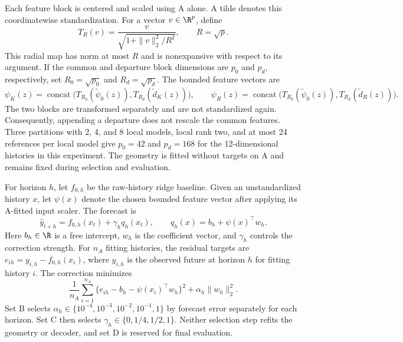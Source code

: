 Each feature block is centered and scaled using A alone. A tilde denotes
this coordinatewise standardization. For a vector $v\in\R^p$, define
\begin{equation}
 T_R(v)=\frac{v}{\sqrt{1+\|v\|_2^2/R^2}},\qquad R=\sqrt p.
 \label{eq:mechanism-main-radial}
\end{equation}
This radial map has norm at most $R$ and is nonexpansive with respect to
its argument. If the common and departure block dimensions are $p_0$
and $p_d$, respectively, set $R_0=\sqrt{p_0}$ and $R_d=\sqrt{p_d}$.
The bounded feature vectors are
\[
 \psi_K(z)=\operatorname{concat}\bigl(
       T_{R_0}(\widetilde\psi_0(z)),T_{R_d}(\widetilde d_K(z))\bigr),
 \qquad
 \psi_R(z)=\operatorname{concat}\bigl(
       T_{R_0}(\widetilde\psi_0(z)),T_{R_d}(\widetilde d_R(z))\bigr).
\]
The two blocks are transformed separately and are not standardized again.
Consequently, appending a departure does not rescale the common features.
Three partitions with 2, 4, and 8 local models, local rank two, and at
most 24 references per local model give $p_0=42$ and $p_d=168$ for the
12-dimensional histories in this experiment. The geometry is fitted
without targets on A and remains fixed during selection and evaluation.

For horizon $h$, let $f_{0,h}$ be the raw-history ridge baseline. Given
an unstandardized history $x$, let $\psi(x)$ denote the chosen bounded
feature vector after applying its A-fitted input scaler. The forecast is
\begin{equation}
 \widehat y_{t+h}=f_{0,h}(x_t)+\gamma_h q_h(x_t),\qquad
 q_h(x)=b_h+\psi(x)^\top w_h.
 \label{eq:mechanism-main-forecast}
\end{equation}
Here $b_h\in\R$ is a free intercept, $w_h$ is the coefficient vector,
and $\gamma_h$ controls the correction strength. For $n_A$ fitting
histories, the residual targets are
$e_{ih}=y_{i,h}-f_{0,h}(x_i)$, where $y_{i,h}$ is the observed future
at horizon $h$ for fitting history $i$. The correction minimizes
\[
 \frac1{n_A}\sum_{i=1}^{n_A}
       \{e_{ih}-b_h-\psi(x_i)^\top w_h\}^2
       +\alpha_h\|w_h\|_2^2.
\]
Set B selects $\alpha_h\in\{10^{-4},10^{-3},10^{-2},10^{-1},1\}$
by forecast error separately for each horizon. Set C then selects
$\gamma_h\in\{0,1/4,1/2,1\}$. Neither selection step refits the
geometry or decoder, and set D is reserved for final evaluation.

